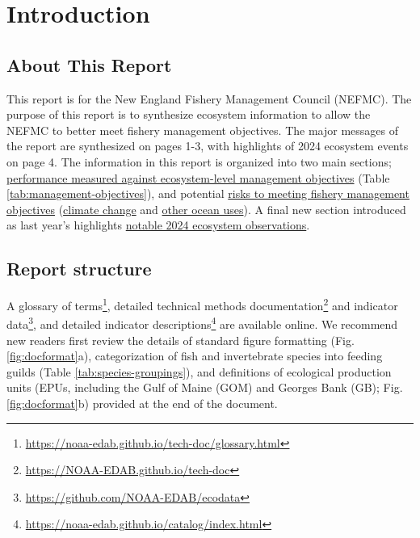 \documentclass[
  10pt,
]{article}
\author{}
\date{\vspace{-2.5em}}
\begin{document}
\setcounter{page}{5}
\thispagestyle{fancy}

\hypertarget{introduction}{%
\section{Introduction}\label{introduction}}

\hypertarget{about-this-report}{%
\subsection{About This Report}\label{about-this-report}}

This report is for the New England Fishery Management Council (NEFMC). The purpose of this report is to synthesize ecosystem information to allow the NEFMC to better meet fishery management objectives. The major messages of the report are synthesized on pages 1-3, with highlights of 2024 ecosystem events on page 4. The information in this report is organized into two main sections; \protect\hyperlink{performance-relative-to-fishery-management-objectives}{performance measured against ecosystem-level management objectives} (Table \ref{tab:management-objectives}), and potential \protect\hyperlink{risks-to-meeting-fishery-management-objectives}{risks to meeting fishery management objectives} (\protect\hyperlink{climate-and-ecosystem-change}{climate change} and \protect\hyperlink{other-ocean-uses-offshore-wind}{other ocean uses}). A final new section introduced as last year's highlights \protect\hyperlink{highlights}{notable 2024 ecosystem observations}.

\hypertarget{report-structure}{%
\subsection{Report structure}\label{report-structure}}

A glossary of terms\footnote{\url{https://noaa-edab.github.io/tech-doc/glossary.html}}, detailed technical methods documentation\footnote{\url{https://NOAA-EDAB.github.io/tech-doc}} and indicator data\footnote{\url{https://github.com/NOAA-EDAB/ecodata}}, and detailed indicator descriptions\footnote{\url{https://noaa-edab.github.io/catalog/index.html}} are available online. We recommend new readers first review the details of standard figure formatting (Fig. \ref{fig:docformat}a), categorization of fish and invertebrate species into feeding guilds (Table \ref{tab:species-groupings}), and definitions of ecological production units (EPUs, including the Gulf of Maine (GOM) and Georges Bank (GB); Fig. \ref{fig:docformat}b) provided at the end of the document.
\end{document}
